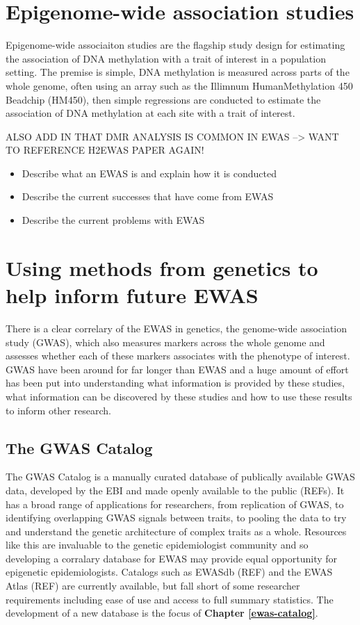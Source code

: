 \documentclass[11pt,twoside]{bristolthesis}
\providecommand{\tightlist}{%
  \setlength{\itemsep}{0pt}\setlength{\parskip}{0pt}}
\begin{document}
\hypertarget{ewas}{%
\section{Epigenome-wide association studies}\label{ewas}}

Epigenome-wide associaiton studies are the flagship study design for estimating the association of DNA methylation with a trait of interest in a population setting. The premise is simple, DNA methylation is measured across parts of the whole genome, often using an array such as the Illimnum HumanMethylation 450 Beadchip (HM450), then simple regressions are conducted to estimate the association of DNA methylation at each site with a trait of interest.

ALSO ADD IN THAT DMR ANALYSIS IS COMMON IN EWAS --\textgreater{} WANT TO REFERENCE H2EWAS PAPER AGAIN!
\begin{itemize}
\tightlist
\item
  Describe what an EWAS is and explain how it is conducted~
\item
  Describe the current successes that have come from EWAS~
\item
  Describe the current problems with EWAS
\end{itemize}
\hypertarget{genetics-in-ewas}{%
\section{Using methods from genetics to help inform future EWAS}\label{genetics-in-ewas}}

There is a clear correlary of the EWAS in genetics, the genome-wide association study (GWAS), which also measures markers across the whole genome and assesses whether each of these markers associates with the phenotype of interest. GWAS have been around for far longer than EWAS and a huge amount of effort has been put into understanding what information is provided by these studies, what information can be discovered by these studies and how to use these results to inform other research.

\hypertarget{gwas-catalog}{%
\subsection{The GWAS Catalog}\label{gwas-catalog}}

The GWAS Catalog is a manually curated database of publically available GWAS data, developed by the EBI and made openly available to the public (REFs). It has a broad range of applications for researchers, from replication of GWAS, to identifying overlapping GWAS signals between traits, to pooling the data to try and understand the genetic architecture of complex traits as a whole. Resources like this are invaluable to the genetic epidemiologist community and so developing a corralary database for EWAS may provide equal opportunity for epigenetic epidemiologists. Catalogs such as EWASdb (REF) and the EWAS Atlas (REF) are currently available, but fall short of some researcher requirements including ease of use and access to full summary statistics. The development of a new database is the focus of \textbf{Chapter \ref{ewas-catalog}}.
\end{document}
